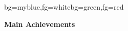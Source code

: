 {
\begin{frame}[plain]

\begin{variableblock}{}{bg=myblue,fg=white}{bg=green,fg=red}
\begin{center}
\textbf{Main Achievements}
\end{center}
\end{variableblock}

\end{frame}
}